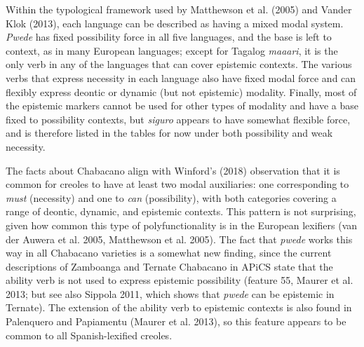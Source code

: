 \documentclass[12pt]{article}
\newenvironment{styleStandard}{\setlength\leftskip{0cm}\setlength\rightskip{0cm plus 1fil}\setlength\parindent{0cm}\setlength\parfillskip{0pt plus 1fil}\setlength\parskip{0in plus 1pt}\writerlistparindent\writerlistleftskip\leavevmode\normalfont\normalsize\writerlistlabel\ignorespaces}{\unskip\vspace{0.111in plus 0.0111in}\par}
\newcommand\writerlistleftskip{}
\newcommand\writerlistparindent{}
\newcommand\writerlistlabel{}
\begin{document}
\begin{styleStandard}
Within the typological framework used by Matthewson et al. (2005) and Vander Klok (2013), each language can be described as having a mixed modal system. \textit{Pwede} has fixed possibility force in all five languages, and the base is left to context, as in many European languages; except for Tagalog \textit{maaari}, it is the only verb in any of the languages that can cover epistemic contexts. The various verbs that express necessity in each language also have fixed modal force and can flexibly express deontic or dynamic (but not epistemic) modality. Finally, most of the epistemic markers cannot be used for other types of modality and have a base fixed to possibility contexts, but \textit{siguro} appears to have somewhat flexible force, and is therefore listed in the tables for now under both possibility and weak necessity. 
\end{styleStandard}

\begin{styleStandard}
The facts about Chabacano align with Winford's (2018) observation that it is common for creoles to have at least two modal auxiliaries: one corresponding to \textit{must }(necessity) and one to \textit{can }(possibility), with both categories covering a range of deontic, dynamic, and epistemic contexts. This pattern is not surprising, given how common this type of polyfunctionality is in the European lexifiers (van der Auwera et al. 2005, Matthewson et al. 2005). The fact that \textit{pwede} works this way in all Chabacano varieties is a somewhat new finding, since the current descriptions of Zamboanga and Ternate Chabacano in APiCS state that the ability verb is not used to express epistemic possibility (feature 55, Maurer et al. 2013; but see also Sippola 2011, which shows that \textit{pwede} can be epistemic in Ternate). The extension of the ability verb to epistemic contexts is also found in Palenquero and Papiamentu (Maurer et al. 2013), so this feature appears to be common to all Spanish-lexified creoles. 
\end{styleStandard}
\end{document}
